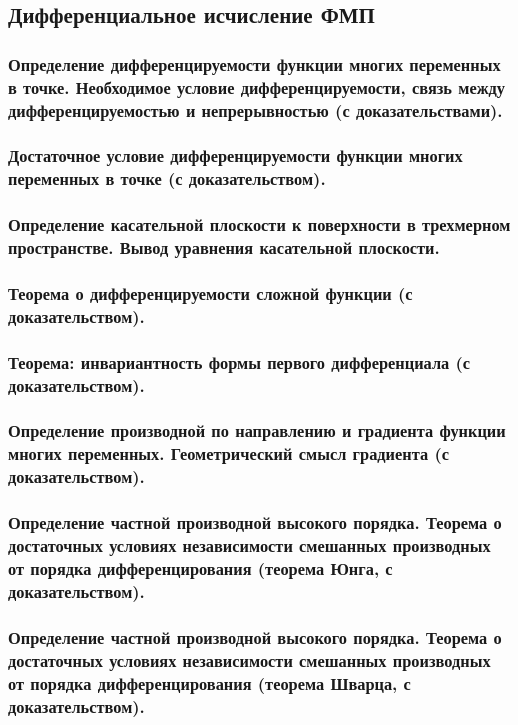 \documentclass[10pt]{article}
\begin{document}
    \subsection{Дифференциальное исчисление ФМП}
    \subsubsection{Определение дифференцируемости функции многих переменных в точке. Необходимое условие дифференцируемости, связь между дифференцируемостью и непрерывностью (с доказательствами).}
    \subsubsection{Достаточное условие дифференцируемости функции многих переменных в точке (с доказательством).}
    \subsubsection{Определение касательной плоскости к поверхности в трехмерном пространстве. Вывод уравнения касательной плоскости.}
    \subsubsection{Теорема о дифференцируемости сложной функции (с доказательством).}
    \subsubsection{Теорема: инвариантность формы первого дифференциала (с доказательством).}
    \subsubsection{Определение производной по направлению и градиента функции многих переменных. Геометрический смысл градиента (с доказательством).}
    \subsubsection{Определение частной производной высокого порядка. Теорема о достаточных условиях независимости смешанных производных от порядка дифференцирования (теорема Юнга, с доказательством).}
    \subsubsection{Определение частной производной высокого порядка. Теорема о достаточных условиях независимости смешанных производных от порядка дифференцирования (теорема Шварца, с доказательством).}
\end{document}
